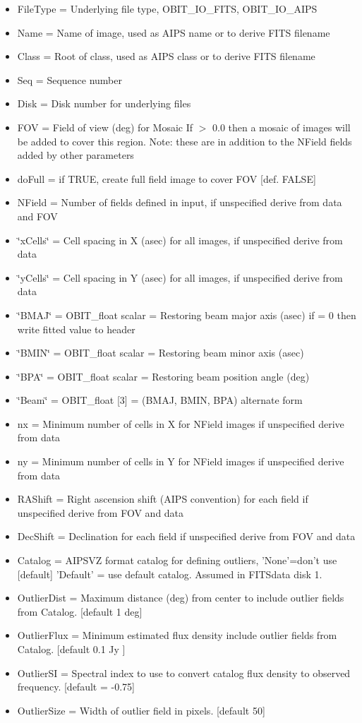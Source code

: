 \begin{Desc}
\begin{description}
\begin{itemize}
\item File\-Type = Underlying file type, OBIT\_\-IO\_\-FITS, OBIT\_\-IO\_\-AIPS \item Name = Name of image, used as AIPS name or to derive FITS filename \item Class = Root of class, used as AIPS class or to derive FITS filename \item Seq = Sequence number \item Disk = Disk number for underlying files \item FOV = Field of view (deg) for Mosaic If $>$ 0.0 then a mosaic of images will be added to cover this region. Note: these are in addition to the NField fields added by other parameters \item do\-Full = if TRUE, create full field image to cover FOV [def. FALSE] \item NField = Number of fields defined in input, if unspecified derive from data and FOV \item \char`\"{}x\-Cells\char`\"{} = Cell spacing in X (asec) for all images, if unspecified derive from data \item \char`\"{}y\-Cells\char`\"{} = Cell spacing in Y (asec) for all images, if unspecified derive from data \item \char`\"{}BMAJ\char`\"{} = OBIT\_\-float scalar = Restoring beam major axis (asec) if = 0 then write fitted value to header \item \char`\"{}BMIN\char`\"{} = OBIT\_\-float scalar = Restoring beam minor axis (asec) \item \char`\"{}BPA\char`\"{} = OBIT\_\-float scalar = Restoring beam position angle (deg) \item \char`\"{}Beam\char`\"{} = OBIT\_\-float [3] = (BMAJ, BMIN, BPA) alternate form \item nx = Minimum number of cells in X for NField images if unspecified derive from data \item ny = Minimum number of cells in Y for NField images if unspecified derive from data \item RAShift = Right ascension shift (AIPS convention) for each field if unspecified derive from FOV and data \item Dec\-Shift = Declination for each field if unspecified derive from FOV and data \item Catalog = AIPSVZ format catalog for defining outliers, 'None'=don't use [default] 'Default' = use default catalog. Assumed in FITSdata disk 1. \item Outlier\-Dist = Maximum distance (deg) from center to include outlier fields from Catalog. [default 1 deg] \item Outlier\-Flux = Minimum estimated flux density include outlier fields from Catalog. [default 0.1 Jy ] \item Outlier\-SI = Spectral index to use to convert catalog flux density to observed frequency. [default = -0.75] \item Outlier\-Size = Width of outlier field in pixels. [default 50] \end{itemize}

\end{description}
\end{Desc}

